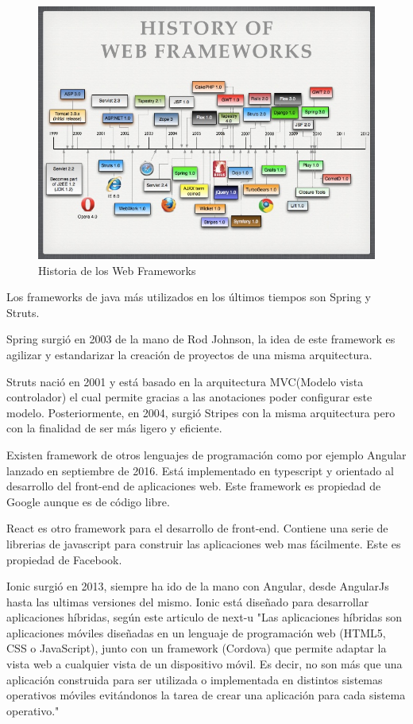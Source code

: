 \documentclass[12pt]{report} %
\begin{document}
  \begin{figure}
 	\centering
 	\includegraphics[width=0.7\linewidth]{imagenes/the-future-of-web-frameworks-11-728}
 	\caption{Historia de los Web Frameworks}
 	\label{fig:webFrameworks}
 \end{figure}

 Los frameworks de java más utilizados en los últimos tiempos son Spring y Struts.
 
 Spring surgió en 2003 de la mano de Rod Johnson, la idea de este framework es agilizar y estandarizar la creación de proyectos de una misma arquitectura. 
 
 Struts nació en 2001 y está basado en la arquitectura MVC(Modelo vista controlador) el cual permite gracias a las anotaciones poder configurar este modelo. Posteriormente, en 2004, surgió Stripes con la misma arquitectura pero con la finalidad de ser más ligero y eficiente.
 
 Existen framework de otros lenguajes de programación como por ejemplo Angular lanzado en septiembre de 2016. Está implementado en typescript y orientado al desarrollo del front-end de aplicaciones web. Este framework es propiedad de Google aunque es de código libre.
 
 React es otro framework para el desarrollo de front-end. Contiene una serie de librerias de javascript para construir las aplicaciones web mas fácilmente. Este es propiedad de Facebook.
 
 Ionic surgió en 2013, siempre ha ido de la mano con Angular, desde AngularJs hasta las ultimas versiones del mismo. Ionic está diseñado para desarrollar aplicaciones híbridas, según este articulo de next-u \cite{AppHibridas} "Las aplicaciones híbridas son aplicaciones móviles diseñadas en un lenguaje de programación web (HTML5, CSS o JavaScript), junto con un framework (Cordova) que permite adaptar la vista web a cualquier vista de un dispositivo móvil. Es decir, no son más que una aplicación construida para ser utilizada o implementada en distintos sistemas operativos móviles evitándonos la tarea de crear una aplicación para cada sistema operativo."
 
\end{document}
